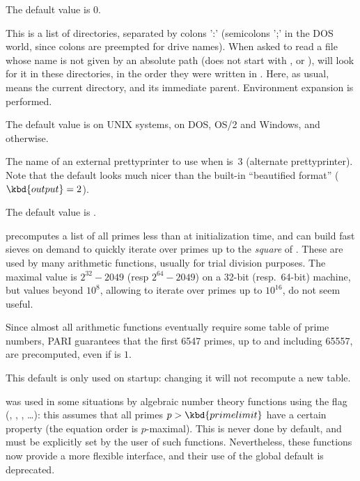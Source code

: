 {The default value is $0$.

\label{se:def,path}
This is a list of directories, separated by colons ':'
(semicolons ';' in the DOS world, since colons are preempted for drive names).
When asked to read a file whose name is not given by an absolute path
(does not start with \kbd{/},  or ),  will look for
it in these directories, in the order they were written in . Here,
as usual,  means the current directory, and  its immediate
parent. Environment expansion is performed.

The default value is  on UNIX systems,
 on DOS, OS/2 and Windows, and  otherwise.

\label{se:def,prettyprinter}
The name of an external prettyprinter to use when
 is~3 (alternate prettyprinter). Note that the default
 looks much nicer than the built-in ``beautified
format'' ($\kbd{output} = 2$).

The default value is .

\label{se:def,primelimit}
 precomputes a list of
all primes less than  at initialization time, and can build
fast sieves on demand to quickly iterate over primes up to the \emph{square}
of . These are used by many arithmetic functions, usually for
trial division purposes. The maximal value is $2^{32} - 2049$ (resp $2^{64} -
2049$) on a 32-bit (resp.~64-bit) machine, but values beyond $10^8$,
allowing to iterate over primes up to $10^{16}$, do not seem useful.

Since almost all arithmetic functions eventually require some table of prime
numbers, PARI guarantees that the first 6547 primes, up to and
including 65557, are precomputed, even if  is $1$.

This default is only used on startup: changing it will not recompute a new
table.

  was used in some
situations by algebraic number theory functions using the
 flag (, , , \dots):
this assumes that all primes $p > \kbd{primelimit}$ have a certain
property (the equation order is $p$-maximal). This is never done by default,
and must be explicitly set by the user of such functions. Nevertheless,
these functions now provide a more flexible interface, and their use
of the global default  is deprecated.

}
